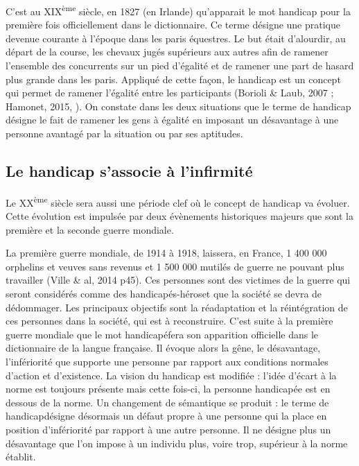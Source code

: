 C'est au XIX\textsuperscript{ème} siècle, en 1827 (en Irlande) qu'apparait le mot \og handicap\fg{} pour la première fois officiellement dans le dictionnaire. Ce terme désigne une pratique devenue courante à l'époque dans les paris équestres. Le but était d'alourdir, au départ de la course, les chevaux jugés supérieurs aux autres afin de ramener l'ensemble des concurrents sur un pied d'égalité et de ramener une part de hasard plus grande dans les paris. Appliqué de cette façon, le handicap est un concept qui permet de ramener l'égalité entre les participants (Borioli \& Laub, 2007 \cite{BorioliLaub2007}; Hamonet, 2015, \cite{Hamonet2015}). On constate dans les deux situations que le terme de handicap désigne le fait de ramener les gens à égalité en imposant un désavantage à une personne avantagé par la situation ou par ses aptitudes.

\subsection{Le handicap s'associe à l'infirmité}
Le XX\textsuperscript{ème} siècle sera aussi une période clef où le concept de handicap va évoluer. Cette évolution est impulsée par deux évènements historiques majeurs que sont la première et la seconde guerre mondiale.

La première guerre mondiale, de 1914 à 1918, laissera, en France, 1 400 000 orphelins et veuves sans revenus et 1 500 000 mutilés de guerre ne pouvant plus travailler (Ville \& al, 2014 \cite{Ville2014} p45). Ces personnes sont des victimes de la guerre qui seront considérés comme des \og handicapés-héros\fg et que la société se devra de dédommager. Les principaux objectifs sont la réadaptation et la réintégration de ces personnes dans la société, qui est à reconstruire. C'est suite à la première guerre mondiale que le mot \og handicapé\fg fera son apparition officielle dans le dictionnaire de la langue française. Il évoque alors la gêne, le désavantage, l'infériorité que supporte une personne par rapport aux conditions normales d'action et d'existence. La vision du handicap est modifiée : l'idée d'écart à la norme est toujours présente mais cette fois-ci, la personne handicapée est en dessous de la norme. Un changement de sémantique se produit : le terme de \og handicap\fg désigne désormais un défaut propre à une personne qui la place en position d’infériorité par rapport à une autre personne. Il ne désigne plus un désavantage que l’on impose à un individu plus, voire trop, supérieur à la norme établit.

